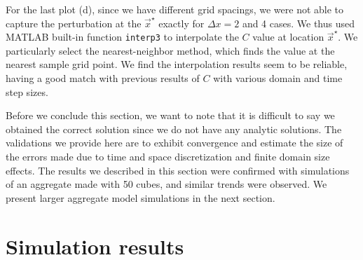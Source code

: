 \par
For the last plot (d), since we have different grid spacings, we were not able to capture the perturbation at the $\vec{x}^{\star}$ exactly for $\Delta x = 2$ and 4 cases.  
We thus used MATLAB built-in function \verb+interp3+ to interpolate the $C$ value at location $\vec{x}^{\star}$. We particularly select the nearest-neighbor method, which finds the value at the nearest sample grid point. We find the interpolation results seem to be reliable, having a good match with previous results of $C$ with various domain and time step sizes. 

\par
\vphantom{D}
\par
Before we conclude this section, we want to note that it is difficult to say we obtained the correct solution since we do not have any analytic solutions. The validations we provide here are to exhibit convergence and estimate the size of the errors made due to time and space discretization and finite domain size effects.
The results we described in this section were confirmed with simulations of an aggregate made with 50 cubes, and similar trends were observed. We present larger aggregate model simulations in the next section.
\section{Simulation results}
\label{sec:stratified_results}
